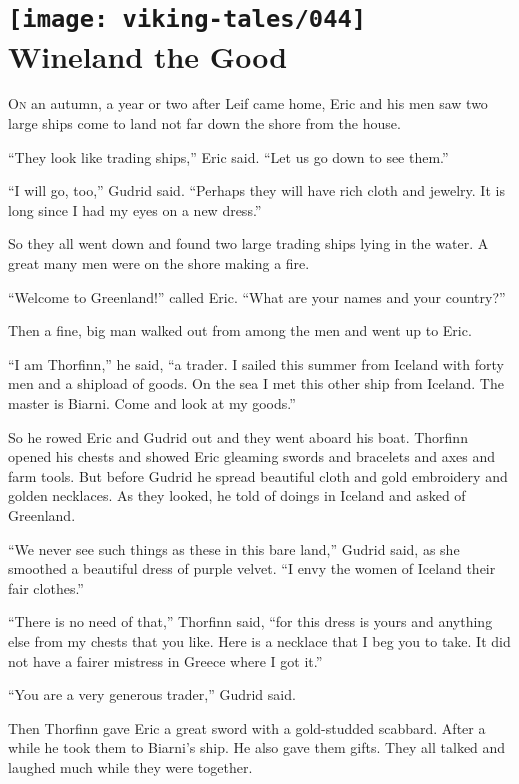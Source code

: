 \section[Wineland the Good]{
    \texttt{[image: viking-tales/044]}\\
    Wineland the Good}

\lettrine{O}{n} an autumn, a year or two after Leif came home, Eric and
his men saw two large ships come to land not far down the shore from the
house.

``They look like trading ships,'' Eric said. ``Let us go down to see
them.''

``I will go, too,'' Gudrid said. ``Perhaps they will have rich cloth and
jewelry. It is long since I had my eyes on a new dress.''

So they all went down and found two large trading ships lying in the
water. A great many men were on the shore making a fire.

``Welcome to Greenland!'' called Eric. ``What are your names and your
country?''

Then a fine, big man walked out from among the men and went up to Eric.

``I am Thorfinn,'' he said, ``a trader. I sailed this summer from
Iceland with forty men and a shipload of goods. On the sea I met this
other ship from Iceland. The master is Biarni. Come and look at my
goods.''

So he rowed Eric and Gudrid out and they went aboard his boat. Thorfinn
opened his chests and showed Eric gleaming swords and bracelets and axes
and farm tools. But before Gudrid he spread beautiful cloth and gold
embroidery and golden necklaces. As they looked, he told of doings in
Iceland and asked of Greenland.

``We never see such things as these in this bare land,'' Gudrid said, as
she smoothed a beautiful dress of purple velvet. ``I envy the women of
Iceland their fair clothes.''

``There is no need of that,'' Thorfinn said, ``for this dress is yours
and anything else from my chests that you like. Here is a necklace that
I beg you to take. It did not have a fairer mistress in Greece where I
got it.''

``You are a very generous trader,'' Gudrid said.

Then Thorfinn gave Eric a great sword with a gold-studded scabbard.
After a while he took them to Biarni's ship. He also gave them gifts.
They all talked and laughed much while they were together.

